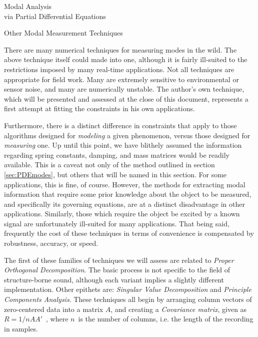 \documentclass[a4paper,10pt]{report}
\numberwithin{equation}{section}
\begin{document}
{\begin{chapter}
\begin{section}{Modal Analysis \\via Partial Differential Equations}
\end{section}
\begin{section}{Other Modal Measurement Techniques}
\par
There are many numerical techniques for measuring modes in the wild. The above technique itself could made into one, although it is fairly ill-suited to the restrictions imposed by many real-time applications. Not all techniques are appropriate for field work. Many are extremely sensitive to environmental or sensor noise, and many are numerically unstable. The author's own technique, which will be presented and assessed at the close of this document, represents a first attempt at fitting the constraints in his own applications. 
\par
Furthermore, there is a distinct difference in constraints that apply to those algorithms designed for \emph{modeling} a given phenomenon, versus those designed for \emph{measuring} one. Up until this point, we have blithely assumed the information regarding spring constants, damping, and mass matrices would be readily available. This is a caveat not only of the method outlined in section \ref{sec:PDEmodes}, but others that will be named in this section. For some applications, this is fine, of course. However, the methods for extracting modal information that require some prior knowledge about the object to be measured, and specifically its governing equations, are at a distinct disadvantage in other applications. Similarly, those which require the object be excited by a known signal are unfortunately ill-suited for many applications. That being said, frequently the cost of these techniques in terms of convenience is compensated by robustness, accuracy, or speed.
\par
The first of these families of techniques we will assess are related to \emph{Proper Orthogonal Decomposition}. \cite{Han2003} \cite{Kerschen2002} \cite{Feeny1998} The basic process is not specific to the field of structure-borne sound, although each variant implies a slightly different implementation. Other epithets are: \emph{Singular Value Decomposition} and \emph{Principle Components Analysis}. These techniques all begin by arranging column vectors of zero-centered data into a matrix $A$, and creating a \emph{Covariance matrix}, given as $R = 1/n A A'$\  , where $n$\  is the number of columns, i.e. the length of the recording in samples. 
\par

\end{section}
\end{chapter}}
\end{document}
